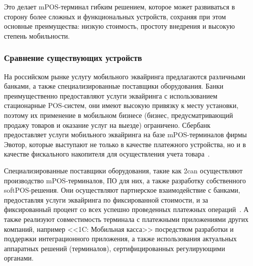 Это делает mPOS-терминал гибким решением, которое может развиваться в сторону более сложных и функциональных устройств, сохраняя при этом основные преимущества: низкую стоимость, простоту внедрения и высокую степень мобильности.


\subsubsection{Сравнение существующих устройств}

На российском рынке услугу мобильного эквайринга предлагаются различными банками, а также специализированные поставщики оборудования.
Банки преимущественно предоставляют услуги эквайринга с использованием стационарные POS-систем, они имеют высокую привязку к месту установки, поэтому их применение в мобильном бизнесе (бизнес, предусматривающий продажу товаров и оказание услуг на выезде) ограничено.
Сбербанк предоставляет услуги мобильного эквайринга на базе mPOS-терминалов фирмы Эвотор, которые выступают не только в качестве платежного устройства, но и в качестве фискального накопителя для осуществления учета товара~\cite{sber_acq}.

Специализированные поставщики оборудования, такие как 2can осуществляют производство mPOS-терминалов, ПО для них, а также разработку собственного softPOS-решения.
Они осуществляют партнерское взаимодействие с банками, предоставляя услуги эквайринга по фиксированной стоимости, и за фиксированный процент со всех успешно проведенных платежных операций~\cite{2can_mpos}.
А также реализуют совместимость терминала с платежными приложениями других компаний, например <<1C: Мобильная касса>> посредством разработки и поддержки интеграционного приложения, а также использования актуальных аппаратных решений (терминалов), сертифицированных регулирующими органами.

